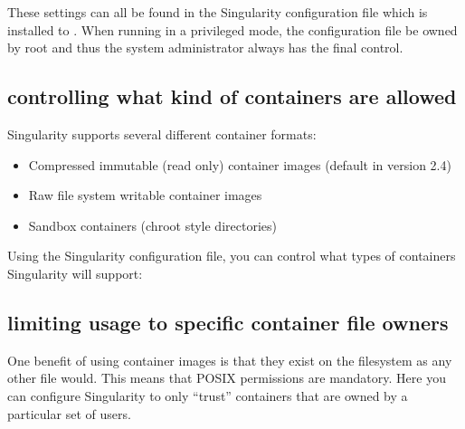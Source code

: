 \documentclass[letterpaper,10pt,english]{sphinxmanual}
\begin{document}
These settings can all be found in the Singularity configuration file
which is installed to . When running in a privileged mode, the
configuration file  be owned by root and thus the system
administrator always has the final control.


\subsection{controlling what kind of containers are allowed}
\label{\detokenize{security:controlling-what-kind-of-containers-are-allowed}}
Singularity supports several different container formats:
\begin{itemize}
\item {} 
 Compressed immutable (read only) container images
(default in version 2.4)

\item {} 
 Raw file system writable container images

\item {} 
 Sandbox containers (chroot style directories)

\end{itemize}

Using the Singularity configuration file, you can control what types of
containers Singularity will support:

%
\begin{sphinxVerbatim}[commandchars=\\\{\}]




    

    

    
\end{sphinxVerbatim}


\subsection{limiting usage to specific container file owners}
\label{\detokenize{security:limiting-usage-to-specific-container-file-owners}}
One benefit of using container images is that they exist on the
filesystem as any other file would. This means that POSIX permissions
are mandatory. Here you can configure Singularity to only “trust”
containers that are owned by a particular set of users.
\end{document}
